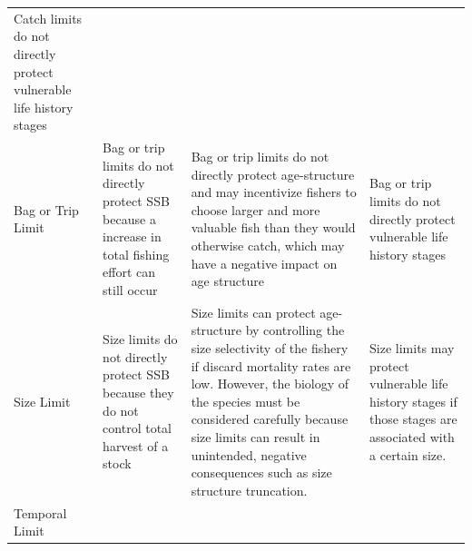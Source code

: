 \documentclass[]{book}
\begin{document}
\begin{longtable}[]{@{}llll@{}}
\begin{minipage}[t]{0.22\columnwidth}
Catch limits do not directly protect vulnerable life history
stages\strut
\end{minipage}\tabularnewline
\begin{minipage}[t]{0.22\columnwidth}\raggedright\strut
Bag or Trip Limit\strut
\end{minipage} & \begin{minipage}[t]{0.22\columnwidth}\raggedright\strut
Bag or trip limits do not directly protect SSB because a increase in
total fishing effort can still occur\strut
\end{minipage} & \begin{minipage}[t]{0.22\columnwidth}\raggedright\strut
Bag or trip limits do not directly protect age-structure and may
incentivize fishers to choose larger and more valuable fish than they
would otherwise catch, which may have a negative impact on age
structure\strut
\end{minipage} & \begin{minipage}[t]{0.22\columnwidth}\raggedright\strut
Bag or trip limits do not directly protect vulnerable life history
stages\strut
\end{minipage}\tabularnewline
\begin{minipage}[t]{0.22\columnwidth}\raggedright\strut
Size Limit\strut
\end{minipage} & \begin{minipage}[t]{0.22\columnwidth}\raggedright\strut
Size limits do not directly protect SSB because they do not control
total harvest of a stock\strut
\end{minipage} & \begin{minipage}[t]{0.22\columnwidth}\raggedright\strut
Size limits can protect age-structure by controlling the size
selectivity of the fishery if discard mortality rates are low. However,
the biology of the species must be considered carefully because size
limits can result in unintended, negative consequences such as size
structure truncation.\strut
\end{minipage} & \begin{minipage}[t]{0.22\columnwidth}\raggedright\strut
Size limits may protect vulnerable life history stages if those stages
are associated with a certain size.\strut
\end{minipage}\tabularnewline
\begin{minipage}[t]{0.22\columnwidth}\raggedright\strut
Temporal Limit\strut
\end{minipage} & \begin{minipage}[t]{0.22\columnwidth}\raggedright\strut

\end{minipage}
\end{longtable}
\end{document}
